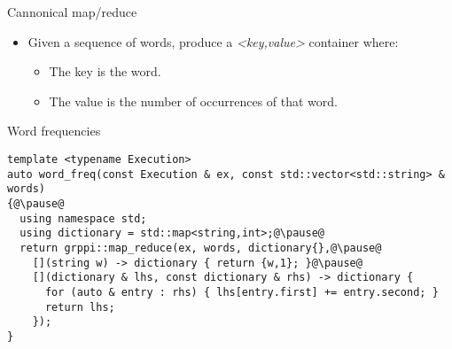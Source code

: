 \begin{frame}[t,fragile]{Cannonical map/reduce}
\begin{itemize}
  \item Given a sequence of words, produce a \emph{<key,value>} container where:
    \begin{itemize}
      \item The key is the word.
      \item The value is the number of occurrences of that word.
    \end{itemize}
\end{itemize}
\vfill\pause
\begin{block}{Word frequencies}
\begin{lstlisting}[escapechar=@]
template <typename Execution>
auto word_freq(const Execution & ex, const std::vector<std::string> & words)
{@\pause@
  using namespace std;
  using dictionary = std::map<string,int>;@\pause@
  return grppi::map_reduce(ex, words, dictionary{},@\pause@
    [](string w) -> dictionary { return {w,1}; }@\pause@
    [](dictionary & lhs, const dictionary & rhs) -> dictionary {
      for (auto & entry : rhs) { lhs[entry.first] += entry.second; }
      return lhs;
    });
}
\end{lstlisting}
\end{block}
\end{frame}
